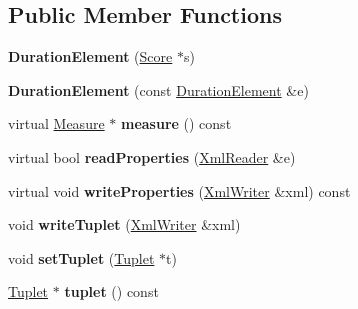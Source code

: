 \subsection*{Public Member Functions}
\begin{DoxyCompactItemize}
\item 
\mbox{\label{class_ms_1_1_duration_element_a35c782412f157fabf11da9d4d323a320}} 
{\bfseries Duration\+Element} (\hyperlink{class_ms_1_1_score}{Score} $\ast$s)
\item 
\mbox{\label{class_ms_1_1_duration_element_ac346b8dcbed275d0e3016ef223db0a0e}} 
{\bfseries Duration\+Element} (const \hyperlink{class_ms_1_1_duration_element}{Duration\+Element} \&e)
\item 
\mbox{\label{class_ms_1_1_duration_element_a1d7ff108b0bca7a82ab5ddccf86a1641}} 
virtual \hyperlink{class_ms_1_1_measure}{Measure} $\ast$ {\bfseries measure} () const
\item 
\mbox{\label{class_ms_1_1_duration_element_a101aa1abf092ed35e1d601c77431bcac}} 
virtual bool {\bfseries read\+Properties} (\hyperlink{class_ms_1_1_xml_reader}{Xml\+Reader} \&e)
\item 
\mbox{\label{class_ms_1_1_duration_element_acc9c6bd5b87f6e2ec66181642917f281}} 
virtual void {\bfseries write\+Properties} (\hyperlink{class_ms_1_1_xml_writer}{Xml\+Writer} \&xml) const
\item 
\mbox{\label{class_ms_1_1_duration_element_acae45c6a06f843932b6abeb9f2392fae}} 
void {\bfseries write\+Tuplet} (\hyperlink{class_ms_1_1_xml_writer}{Xml\+Writer} \&xml)
\item 
\mbox{\label{class_ms_1_1_duration_element_ab33a18c124a4f211bf9754856916fb80}} 
void {\bfseries set\+Tuplet} (\hyperlink{class_ms_1_1_tuplet}{Tuplet} $\ast$t)
\item 
\mbox{\label{class_ms_1_1_duration_element_a5eae2d4a8a4a01245e2a18d97ee7988a}} 
\hyperlink{class_ms_1_1_tuplet}{Tuplet} $\ast$ {\bfseries tuplet} () const

\end{DoxyCompactItemize}
